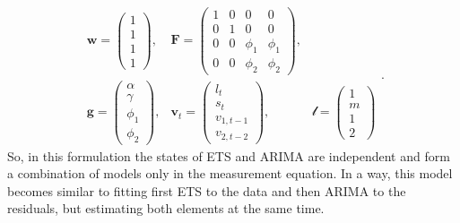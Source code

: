 \documentclass[
]{book}
\theoremstyle{definition}
\theoremstyle{definition}
\theoremstyle{definition}
\theoremstyle{definition}
\theoremstyle{remark}
\begin{document}
\begin{equation}
  \begin{aligned}
    \mathbf{w} = \begin{pmatrix} 1 \\ 1 \\ 1 \\ 1 \end{pmatrix}, & \mathbf{F} = \begin{pmatrix} 1 & 0 & 0 & 0 \\ 0 & 1 & 0 & 0 \\ 0 & 0 & \phi_1 & \phi_1 \\ 0 & 0 & \phi_2 & \phi_2 \end{pmatrix}, \\
    \mathbf{g} = \begin{pmatrix} \alpha \\ \gamma \\ \phi_1 \\ \phi_2 \end{pmatrix}, & \mathbf{v}_{t} = \begin{pmatrix} l_t \\ s_t \\ v_{1,t-1} \\ v_{2,t-2} \end{pmatrix}, & \boldsymbol{\mathscr{l}} = \begin{pmatrix} 1 \\ m \\ 1 \\ 2\end{pmatrix}
  \end{aligned}.
  \label{eq:ADAMETSARIMAANN100Matrices}
\end{equation}
So, in this formulation the states of ETS and ARIMA are independent and form a combination of models only in the measurement equation. In a way, this model becomes similar to fitting first ETS to the data and then ARIMA to the residuals, but estimating both elements at the same time.
\end{document}

